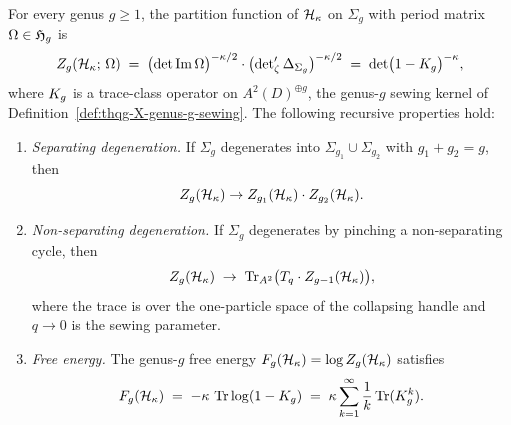 \begin{theorem}%
\label{thm:thqg-X-general-genus-fredholm}%
%
For every genus $g \geq 1$, the partition function of
$\mathcal{H}_\kappa$ on $\Sigma_g$ with period matrix
$\Omega \in \mathfrak{H}_g$ is
\begin{equation}\label{eq:thqg-X-general-genus-formula}
Z_g(\mathcal{H}_\kappa;\,\Omega)
\;=\;
\bigl(\det\operatorname{Im}\Omega\bigr)^{-\kappa/2}
\cdot
\bigl(\det\nolimits'_\zeta\Delta_{\Sigma_g}\bigr)^{-\kappa/2}
\;=\;
\det\bigl(1 - K_g\bigr)^{-\kappa},
\end{equation}
where $K_g$ is a trace-class operator on
$A^2(D)^{\oplus g}$, the genus-$g$ sewing kernel of
Definition~\textup{\ref{def:thqg-X-genus-g-sewing}}.
The following recursive properties hold:
\begin{enumerate}[label=\textup{(\roman*)}]
\item \emph{Separating degeneration.}
 If $\Sigma_g$ degenerates into $\Sigma_{g_1} \cup \Sigma_{g_2}$
 with $g_1 + g_2 = g$, then
 \begin{equation}\label{eq:thqg-X-separating-factorization}
 Z_g(\mathcal{H}_\kappa) \to
 Z_{g_1}(\mathcal{H}_\kappa) \cdot Z_{g_2}(\mathcal{H}_\kappa).
 \end{equation}
\item \emph{Non-separating degeneration.}
 If $\Sigma_g$ degenerates by pinching a non-separating cycle,
 then
 \begin{equation}\label{eq:thqg-X-nonseparating-limit}
 Z_g(\mathcal{H}_\kappa)
 \;\to\;
 \operatorname{Tr}_{A^2}\bigl(T_q \cdot Z_{g-1}(\mathcal{H}_\kappa)
 \bigr),
 \end{equation}
 where the trace is over the one-particle space of the
 collapsing handle and $q \to 0$ is the sewing parameter.
\item \emph{Free energy.}
 The genus-$g$ free energy
 $F_g(\mathcal{H}_\kappa) = \log Z_g(\mathcal{H}_\kappa)$ satisfies
 \begin{equation}\label{eq:thqg-X-free-energy-genus}
 F_g(\mathcal{H}_\kappa)
 \;=\;
 -\kappa\,\operatorname{Tr}\log(1 - K_g)
 \;=\;
 \kappa\sum_{k=1}^{\infty}
 \frac{1}{k}\operatorname{Tr}(K_g^k).
 \end{equation}
\end{enumerate}
\end{theorem}

